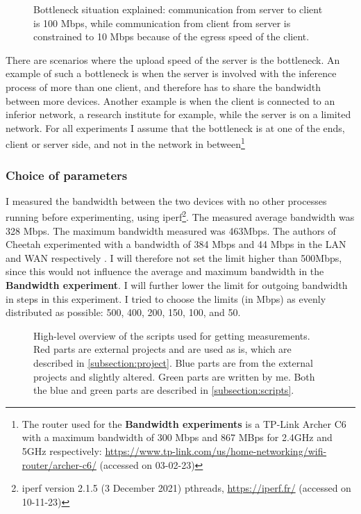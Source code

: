 \documentclass[../thesis.tex]{subfiles}
\begin{document}
\begin{figure}[hb]
    \centering
       
    \caption{Bottleneck situation explained: communication from server to client is 100 Mbps, while communication from client from server is constrained to 10 Mbps because of the egress speed of the client.}
    \label{fig:bottleneck}
\end{figure}

There are scenarios where the upload speed of the server is the bottleneck. An example of such a bottleneck is when the server is involved with the inference process of more than one client, and therefore has to share the bandwidth between more devices. Another example is when the client is connected to an inferior network, a research institute for example, while the server is on a limited network. For all experiments I assume that the bottleneck is at one of the ends, client or server side, and not in the network in between\footnote{The router used for the \textbf{Bandwidth experiments} is a TP-Link Archer C6 with a maximum bandwidth of 300 Mbps and 867 MBps for 2.4GHz and 5GHz respectively: \url{https://www.tp-link.com/us/home-networking/wifi-router/archer-c6/} (accessed on 03-02-23)} 
\subsubsection{Choice of parameters}
I measured the bandwidth between the two devices with no other processes running before experimenting, using iperf\footnote{iperf version 2.1.5 (3 December 2021) pthreads, \url{https://iperf.fr/} (accessed on 10-11-23)}.  The measured average bandwidth was 328 Mbps. The maximum bandwidth measured was 463Mbps. The authors of Cheetah experimented with a bandwidth of 384 Mbps and 44 Mbps in the LAN and WAN respectively \parencite[p. 12]{cheetah}. I will therefore not set the limit higher than 500Mbps, since this would not influence the average and maximum bandwidth in the \textbf{Bandwidth experiment}. I will further lower the limit for outgoing bandwidth in steps in this experiment. I tried to choose the limits (in Mbps) as evenly distributed as possible: 500, 400, 200, 150, 100, and 50.

\begin{figure}[t]
    \centering
       
    \caption{High-level overview of the scripts used for getting measurements. \color{red}Red \color{black} parts are external projects and are used as is, which are described in \autoref{subsection:project}. \color{blue}Blue \color{black} parts are from the external projects and slightly altered. \color{green}Green \color{black} parts are written by me. Both the blue and green parts are described in \autoref{subsection:scripts}.}
    \label{fig:scripts}
\end{figure}
\end{document}
